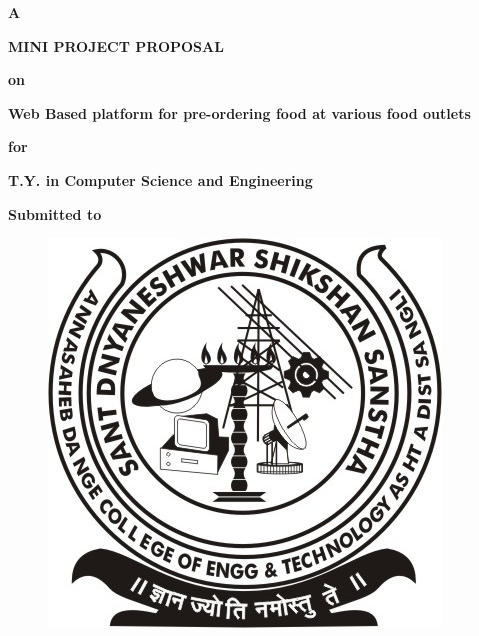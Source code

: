 \documentclass[english]{article}
\begin{document}
\pagestyle{empty}


\begin{center}
\textbf{\large A}{\LARGE{} }
\end{center}
\begin{center}
\textbf{\LARGE MINI PROJECT PROPOSAL}{\LARGE{} }
\end{center}

\begin{center}
\textbf{\large on}
\end{center}

\begin{center}
\textbf{\Large Web Based platform for pre-ordering food at various food outlets}
\end{center}

\vspace{2pt}
\begin{center}
{\textbf{\large for} } 
\end{center}

\begin{center}
\textbf{\Large T.Y. in Computer Science and Engineering}
\end{center}

\begin{center}
{ \textbf{\large Submitted to}} 
\end{center}
\vspace{2pt}
\begin{figure}[H]
\centering
\includegraphics[scale=0.8]{logo.jpeg}
\end{figure}
\end{document}
